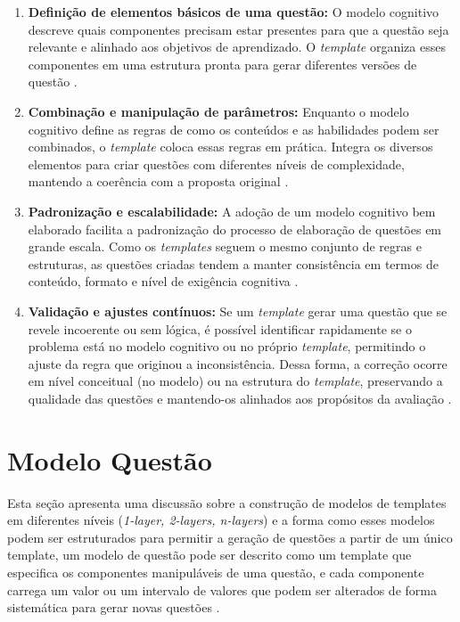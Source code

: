 \begin{enumerate} \item \textbf{Definição de elementos básicos de uma questão:} O modelo cognitivo descreve quais componentes  precisam estar presentes para que a questão seja relevante e alinhado aos objetivos de aprendizado. O \textit{template} organiza esses componentes em uma estrutura pronta para gerar diferentes versões de questão \parencite{lane2016}.

\item \textbf{Combinação e manipulação de parâmetros:}
Enquanto o modelo cognitivo define as regras de como os conteúdos e as habilidades podem ser combinados, o \textit{template} coloca essas regras em prática. Integra os diversos elementos para criar questões com diferentes níveis de complexidade, mantendo a coerência com a proposta original \parencite{embretson2017}.

\item \textbf{Padronização e escalabilidade:}
A adoção de um modelo cognitivo bem elaborado facilita a padronização do processo de elaboração de questões em grande escala. Como os \textit{templates} seguem o mesmo conjunto de regras e estruturas, as questões criadas tendem a manter consistência em termos de conteúdo, formato e nível de exigência cognitiva \parencite{gierl2017}.

\item \textbf{Validação e ajustes contínuos:}
Se um \textit{template} gerar uma questão que se revele incoerente ou sem lógica, é possível identificar rapidamente se o problema está no modelo cognitivo ou no próprio \textit{template}, permitindo o ajuste da regra que originou a inconsistência. Dessa forma, a correção ocorre em nível conceitual (no modelo) ou na estrutura do \textit{template}, preservando a qualidade das questões e mantendo-os alinhados aos propósitos da avaliação \parencite{gierlbulutzhang2018}.
\end{enumerate}


\section{Modelo Questão}

 Esta seção apresenta uma discussão sobre a construção de modelos de templates em diferentes níveis (\textit{1-layer, 2-layers, n-layers}) e a forma como esses modelos podem ser estruturados para permitir a geração de questões a partir de um único template, um modelo de questão pode ser descrito como um template que especifica os componentes manipuláveis de uma questão, e cada componente carrega um valor ou um intervalo de valores que podem ser alterados de forma sistemática para gerar novas questões \parencite{gierl2021}.

